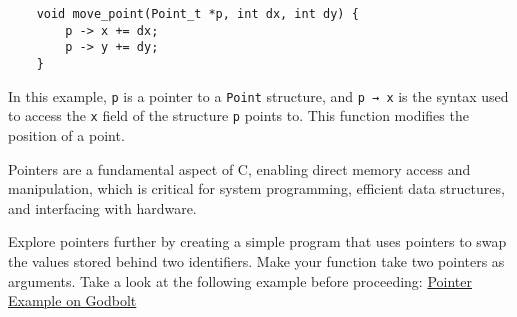 \documentclass{dcbl/challenge}
\begin{document}
\begin{aufgabe}
\begin{lstlisting}
    void move_point(Point_t *p, int dx, int dy) {
        p -> x += dx;
        p -> y += dy;
    }
\end{lstlisting}
In this example, \texttt{p} is a pointer to a \texttt{Point} structure, and \texttt{p → x} is the syntax used to access the \texttt{x} field of the structure \texttt{p} points to. This function modifies the position of a point.

Pointers are a fundamental aspect of C, enabling direct memory access and manipulation, which is critical for system programming, efficient data structures, and interfacing with hardware.

Explore pointers further by creating a simple program that uses pointers to swap the values stored behind two identifiers.
Make your function take two pointers as arguments.
Take a look at the following example before proceeding: \href{https://godbolt.org/#z:OYLghAFBqd5QCxAYwPYBMCmBRdBLAF1QCcAaPECAMzwBtMA7AQwFtMQByARg9KtQYEAysib0QXACx8BBAKoBnTAAUAHpwAMvAFYTStJg1DIApACYAQuYukl9ZATwDKjdAGFUtAK4sGIAMxmpK4AMngMmAByPgBGmMQgZkEADqgKhE4MHt6%2BASlpGQJhEdEscQlJtpj2jgJCBEzEBNk%2BfoFVNZn1jQTFUbHxiUEKDU0tue0jPX2l5UMAlLaoXsTI7Bzm/uHI3lgm/m4j%2BKgAdAj72CYaAIKb27uY%2B4cE6DGonmcXV7c33%2BEEAGoWExwhB5iYAOxWG4A2EA/5wgEAN0aXAB%2BwAIgCuPtoddEQoECRAcjGmZ0f4sVwzLjvoiEXCUcR/BSqWZ/LSYXDaAJgIzGpJWdj2ZJOfjubyATyjKTiABWIXU/ySOVixEAfQs71osoAbIrcQCAPRGgEAdSYCDIAPQTD1AIYeGQCEBGnhIzpcKoPKYgKZEMV7JOKt1arh6GWMXosoAHIHlSc5bqITGxZ7YcliP8qBBzGYzfE/QJ0XK3Bp/By5RZJBpcVwWLK0YjYSB0WY5egS2WKyYqxoWL23Aw86RG%2BD/HjEZns7mktd0MRMAolMji4Py5Xq7WJ/XG82Aa3zHLkl2N72LP3B8PKm3dUyuOPJ3Dp4Ic3mC01VwxTz2q5JRTuDZMuS%2B6Hu2nbrr%2BF4DqW15BLKZiPumAIvgQb5zguS4rkia6lmef4ARYu7AaBbbHj%2Bm6XrBI63sBSFchmWavrO%2BaFl%2BFHniqdZAY0LKkUeEF4VBVFDjRTL%2BPR4qMTOebzouy6YOxkGblxgGynxiJgeRynniJcGjuYd68ZJU5MWhLEfkW346X%2BOJqUygr8e2tCCd2lEwaJN4OSZz5mehZhyVhik4dZQkqXZRE8cQjmaWRJ42dBV40YZ3lhtJzHvmxIUcX%2B26RbKCpOXKtAuTliXUV5jRyj56XmbJmEKUpYWcXlxFVUV8XNX2Hn6bRVU1ShfkWVluFuZxhFtcQ%2BpFa5%2BHlZ58FMrqA2of5gWNdlCX/tx9rNlpnVjd1SU3iljTLWlg0yUkllNYd1aqvZjQBkVVBlXpYlPStQ31fJ2GjXNqn5f6HVvT1yVmEZxAQl9V2sZ%2Bm1ddWEWTXGRW0K9CXvZVxAxjDGUYb9wX/VBkjI1FqOxUeB1zVj8GnTjknIYuBArN%2BeXfJCGLfBwiy0Jwcq8H4HBaKQqCcG41jWACCjLKsimbDwpAEJoPOLAA1iAcoAJwnGYKa6lwWta7qMa6v4SYqvonCSILKui5wvAKCAGhKyrixwLASCYKomDIF4RBkBQECNMACjKIY1RCESADuQuK2gLDJHQvqZOHES0FHqCx3bCdJ/QCTAFwGhBLndDxJErDrLwpf5wA8v7mfZ8LvDe771zEKHDvBD7yD1PgQu8PwggiGI7BSDIgiKCo6jN6QuhcPohjGJLlj6HgMRO5AiyoMktQME7HC8KgSLxFmWCb2CpDEF4gh4GwAAq2oX4sMsrGsehHOEaeRzHce8NHxAmDJE4DwXm/NbazzFhwbAPd/YkABKoU2ABaXUgpgDIGQNiDQusAQQAlpYawo5cCEHgQreYvBlbN3mOrEANYTgQjMFwfwMYNDliYag82corYcBtqQIWIsoGO2dq7KhYCOBmAgQIrulCtDUNICfYg6RnCSCAA%3D%3D%3D}{Pointer Example on Godbolt}

\end{aufgabe}
\end{document}
